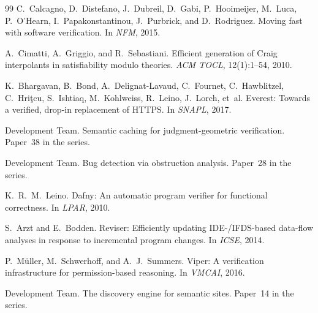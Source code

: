 \documentclass[11pt]{article}
\begin{document}

\begin{thebibliography}{99}
C.~Calcagno, D.~Distefano, J.~Dubreil, D.~Gabi, P.~Hooimeijer, M.~Luca,
P.~O'Hearn, I.~Papakonstantinou, J.~Purbrick, and D.~Rodriguez.
\newblock Moving fast with software verification.
\newblock In \emph{NFM}, 2015.

A.~Cimatti, A.~Griggio, and R.~Sebastiani.
\newblock Efficient generation of Craig interpolants in satisfiability modulo
theories.
\newblock \emph{ACM TOCL}, 12(1):1--54, 2010.

K.~Bhargavan, B.~Bond, A.~Delignat-Lavaud, C.~Fournet, C.~Hawblitzel,
C.~Hri\c{t}cu, S.~Ishtiaq, M.~Kohlweiss, R.~Leino, J.~Lorch, et~al.
\newblock Everest: Towards a verified, drop-in replacement of HTTPS.
\newblock In \emph{SNAPL}, 2017.

\JuGeo{} Development Team.
\newblock Semantic caching for judgment-geometric verification.
\newblock Paper~38 in the \JuGeo{} series.

\JuGeo{} Development Team.
\newblock Bug detection via obstruction analysis.
\newblock Paper~28 in the \JuGeo{} series.

K.~R.~M.~Leino.
\newblock Dafny: An automatic program verifier for functional correctness.
\newblock In \emph{LPAR}, 2010.

S.~Arzt and E.~Bodden.
\newblock Reviser: Efficiently updating IDE-/IFDS-based data-flow analyses
in response to incremental program changes.
\newblock In \emph{ICSE}, 2014.

P.~M{\"u}ller, M.~Schwerhoff, and A.~J.~Summers.
\newblock Viper: A verification infrastructure for permission-based reasoning.
\newblock In \emph{VMCAI}, 2016.

\JuGeo{} Development Team.
\newblock The discovery engine for semantic sites.
\newblock Paper~14 in the \JuGeo{} series.
\end{thebibliography}
\end{document}
